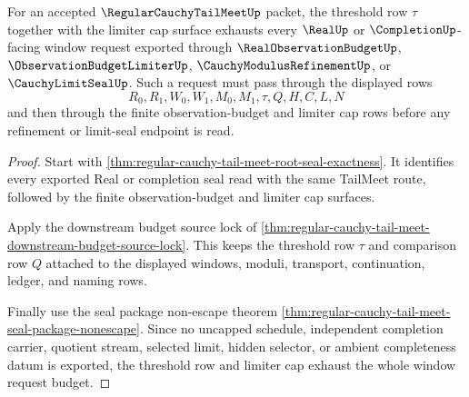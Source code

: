 \begin{theorem}
\label{thm:regular-cauchy-tail-meet-window-threshold-totality}
For an accepted $\RegularCauchyTailMeetUp$ packet, the threshold row $\tau$ together with the limiter cap surface exhausts every $\RealUp$ or $\CompletionUp$-facing window request exported through $\RealObservationBudgetUp$, $\ObservationBudgetLimiterUp$, $\CauchyModulusRefinementUp$, or $\CauchyLimitSealUp$. Such a request must pass through the displayed rows
$$
R_0,R_1,W_0,W_1,M_0,M_1,\tau,Q,H,C,L,N
$$
and then through the finite observation-budget and limiter cap rows before any refinement or limit-seal endpoint is read.
\end{theorem}
\begin{proof}
Start with \autoref{thm:regular-cauchy-tail-meet-root-seal-exactness}. It identifies every exported Real or completion seal read with the same TailMeet route, followed by the finite observation-budget and limiter cap surfaces.

Apply the downstream budget source lock of \autoref{thm:regular-cauchy-tail-meet-downstream-budget-source-lock}. This keeps the threshold row $\tau$ and comparison row $Q$ attached to the displayed windows, moduli, transport, continuation, ledger, and naming rows.

Finally use the seal package non-escape theorem \autoref{thm:regular-cauchy-tail-meet-seal-package-nonescape}. Since no uncapped schedule, independent completion carrier, quotient stream, selected limit, hidden selector, or ambient completeness datum is exported, the threshold row and limiter cap exhaust the whole window request budget.
\end{proof}

